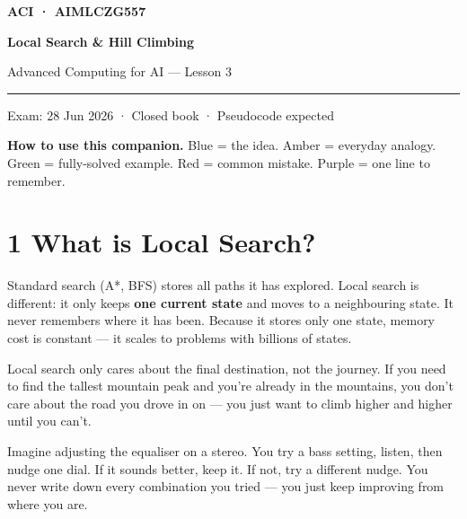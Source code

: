 \documentclass[a4paper,11pt]{article}
\begin{document}
\begin{tcolorbox}[enhanced,colback=NavyBanner,colframe=NavyBanner,arc=0pt,
  boxrule=0pt,left=10mm,right=10mm,top=8mm,bottom=8mm]
  {\small\bfseries\sffamily\color{white}\MakeUppercase{ACI · AIMLCZG557}}\par\vspace{4pt}
  {\LARGE\bfseries\sffamily\color{white}Local Search \& Hill Climbing}\par\vspace{4pt}
  {\normalsize\color{white!80!NavyBanner}Advanced Computing for AI — Lesson 3}\par
  \textcolor{white!40!NavyBanner}{\rule{\linewidth}{0.4pt}}\par\vspace{2pt}
  {\small\color{white!70!NavyBanner}Exam: 28 Jun 2026 · Closed book · Pseudocode expected}
\end{tcolorbox}

\vspace{4pt}
{\small\textbf{How to use this companion.} \textcolor{IntFrame}{Blue} = the idea. \textcolor{EveFrame}{Amber} = everyday analogy. \textcolor{WrkFrame}{Green} = fully-solved example. \textcolor{WatFrame}{Red} = common mistake. \textcolor{KeyFrame}{Purple} = one line to remember.}

\vspace{8pt}

\section{1 \quad What is Local Search?}

Standard search (A*, BFS) stores all paths it has explored. Local search is different: it only keeps \textbf{one current state} and moves to a neighbouring state. It never remembers where it has been. Because it stores only one state, memory cost is constant — it scales to problems with billions of states.

\begin{intuition}
Local search only cares about the final destination, not the journey. If you need to find the tallest mountain peak and you're already in the mountains, you don't care about the road you drove in on — you just want to climb higher and higher until you can't.
\end{intuition}

\begin{everyday}
Imagine adjusting the equaliser on a stereo. You try a bass setting, listen, then nudge one dial. If it sounds better, keep it. If not, try a different nudge. You never write down every combination you tried — you just keep improving from where you are.
\end{everyday}
\end{document}
